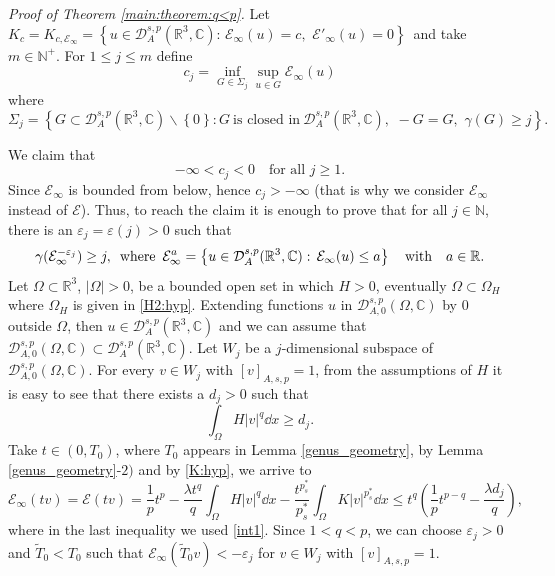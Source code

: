 \documentclass[leqno,11pt]{amsart}
\newcommand{\R}{\mathbb R}
\newcommand{\CC}{\mathbb C}
\newcommand{\C}{\mathbb C}
\newcommand{\cE}{{\mathcal E}}
\newcommand{\cD}{{\mathcal D}}
\numberwithin{equation}{section}
\begin{document}
{\it Proof of Theorem \ref{main:theorem:q<p}.} Let $K_c=K_{c, \cE_\infty}=\left\{u\in \cD^{s,p}_A(\R^3,\CC):\, \cE_\infty(u)=c, \,\,\cE'_{\infty}(u)=0\right\}\,$
and take $m\in\mathbb N^+$. For $1\le j\le m$  define
$$
    c_{j}=\inf_{G\in\Sigma_{j}}\sup_{u\in G}\cE_\infty(u)
$$
where
$$
    \Sigma_{j}=\left\{G\subset \cD^{s,p}_A(\R^3,\CC)\backslash\left\{0\right\}: G \ \text{is closed in} \ \cD^{s,p}_A(\R^3,\CC),\,\, -G=G,\,\,\gamma(G)\ge j\right\}.
$$

We claim that
\begin{equation}\label{cj<0}-\infty<c_j<0\quad\text{for all } j\ge1.
\end{equation}
Since $\cE_\infty$ is bounded from below, hence $c_{j}>-\infty$ (that is why we consider $\cE_\infty$ instead of $\cE$). Thus, to reach the claim it is enough to prove that for all $j\in \mathbb{N}$, there is an
$\varepsilon_{j}=\varepsilon(j)>0$ such that
\begin{equation}\label{gammaeinfty}
    \gamma(\cE_\infty^{-\varepsilon_{j}})\ge j, \,\ \textnormal{where} \,\ \cE_\infty^{a}=\left\{u\in \cD^{s,p}_A(\R^3,\CC):\,
    \cE_\infty(u)\le a\right\}\quad \text{with} \quad a\in\mathbb R.
\end{equation}
Let $\Omega\subset\mathbb{R}^3$, $|\Omega|>0$,  be a bounded open set
in which  $H>0$, eventually $\Omega\subset \Omega_H$  where $\Omega_H$ is given in \eqref{H2:hyp}.
Extending functions $u$ in $\cD^{s,p}_{A,0}(\Omega,\C)$  by
$0$ outside $\Omega$, then $u\in \cD^{s,p}_{A}(\mathbb R^3,\C)$  and we can assume that $\cD^{s,p}_{A,0}(\Omega,\C)\subset \cD^{s,p}_A(\R^3,\CC)$.
Let $W_{j}$ be a $j$-dimensional subspace of $\cD^{s,p}_{A,0}(\Omega,\CC)$.
For every $v\in W_{j}$ with $[v]_{A,s,p}=1$, from the assumptions of
$H$ it is easy to see that there exists a $d_{j}>0$ such that
\begin{equation}\label{int1}
\int_{\Omega}H|v|^q \dd x\ge d_{j}.
\end{equation}
Take $t\in(0,T_{0})$, where $T_0$ appears in Lemma \ref{genus_geometry}, by Lemma \ref{genus_geometry}-$2)$ and by \eqref{K:hyp}, we arrive to
$$
    \cE_\infty(tv)=\cE(tv)=\frac{1}{p}t^{p}-\frac{\lambda t^{q}}{q}\int_{\Omega}H|v|^{q}\dd x-\frac{t^{p^{*}_s}}{p^{*}_s}\int_{\Omega}K|v|^{p^{*}_s}\dd x\le t^{q}\left(\frac{1}{p}
t^{p-q}-\frac{\lambda d_{j}}{q}\right),
$$
where in the last inequality we used \eqref{int1}.
Since $1<q<p$, we can choose $\varepsilon_j>0$ and $\tilde T_0<T_0$ such that $\cE_\infty(\tilde T_0v)<-\varepsilon_j$ for $v\in W_j$ with $[v]_{A,s,p}=1$.
\end{document}
